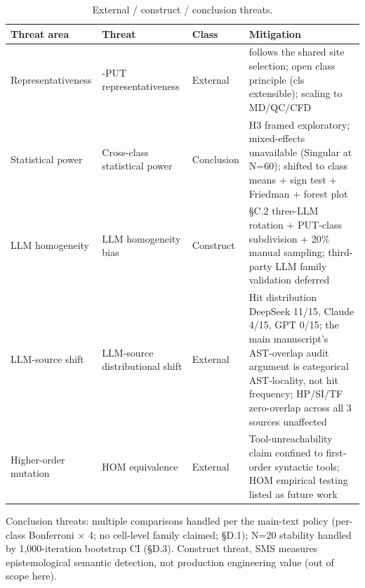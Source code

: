 \documentclass[manuscript,screen,review]{acmart}
\begin{document}
{%
\begin{longtable}[]{@{}
  >{\raggedright\arraybackslash}p{}
  >{\raggedright\arraybackslash}p{}
  >{\raggedright\arraybackslash}p{}
  >{\raggedright\arraybackslash}p{}@{}}
\caption{External / construct / conclusion threats.}\label{tab:p2-28}\\
\toprule\noalign{}
\begin{minipage}[b]{\linewidth}\raggedright
Threat area
\end{minipage} & \begin{minipage}[b]{\linewidth}\raggedright
Threat
\end{minipage} & \begin{minipage}[b]{\linewidth}\raggedright
Class
\end{minipage} & \begin{minipage}[b]{\linewidth}\raggedright
Mitigation
\end{minipage} \\
\midrule\noalign{}
\endfirsthead
\endhead
\bottomrule\noalign{}
\endlastfoot
Representativeness & 12-PUT representativeness & External & follows the shared site selection;
open class principle (cls extensible); scaling to MD/QC/CFD \\
Statistical power & Cross-class statistical power & Conclusion & H3 framed exploratory;
mixed-effects unavailable (Singular at N=60); shifted to class means +
sign test + Friedman + forest plot \\
LLM homogeneity & LLM homogeneity bias & Construct & §C.2 three-LLM rotation +
PUT-class subdivision + 20\% manual sampling; third-party LLM family
validation deferred \\
LLM-source shift & LLM-source distributional shift & External & Hit distribution
DeepSeek 11/15, Claude 4/15, GPT 0/15; the main manuscript's AST-overlap audit argument is categorical
AST-locality, not hit frequency; HP/SI/TF zero-overlap across all 3
sources unaffected \\
Higher-order mutation & HOM equivalence & External & Tool-unreachability claim confined to
first-order syntactic tools; HOM empirical testing listed as future
work \\
\end{longtable}
}

Conclusion threats: multiple comparisons handled per the main-text
policy (per-class Bonferroni $\times$ 4; no cell-level family claimed;
§D.1); N=20 stability handled by 1,000-iteration
bootstrap CI (§D.3). Construct threat, SMS measures epistemological
semantic detection, not production engineering value (out of scope here).
\end{document}
